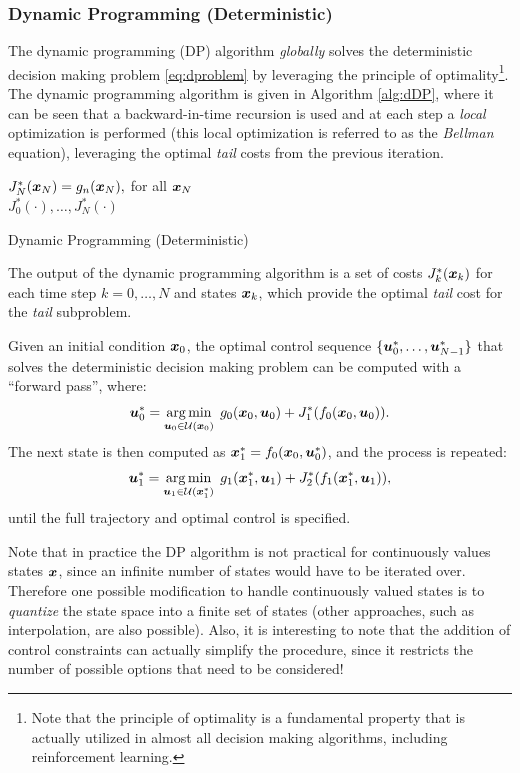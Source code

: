 \subsubsection{Dynamic Programming (Deterministic)}
The dynamic programming (DP) algorithm \textit{globally} solves the deterministic decision making problem \eqref{eq:dproblem} by leveraging the principle of optimality\footnote[][4\baselineskip]{Note that the principle of optimality is a fundamental property that is actually utilized in almost all decision making algorithms, including reinforcement learning.}. The dynamic programming algorithm is given in Algorithm \ref{alg:dDP}, where it can be seen that a backward-in-time recursion is used and at each step a \textit{local} optimization is performed (this local optimization is referred to as the \textit{Bellman} equation), leveraging the optimal \textit{tail} costs from the previous iteration.
\begin{algorithm}[ht]
 $J^*_N(\bm{x}_N) = g_n(\bm{x}_N),$ for all $\bm{x}_N$\\
 \Return $J^*_0(\cdot),\dots,J^*_N(\cdot)$
 \caption{Dynamic Programming (Deterministic)}
 \label{alg:dDP}
\end{algorithm}
The output of the dynamic programming algorithm is a set of costs $J^*_k(\bm{x}_k)$ for each time step $k = 0, \dots,N$ and states $\bm{x}_k$, which provide the optimal \textit{tail} cost for the \textit{tail} subproblem. 

Given an initial condition $\bm{x}_0$, the optimal control sequence $\{\bm{u}^*_0,\dots,\bm{u}^*_{N-1}\}$ that solves the deterministic decision making problem can be computed with a ``forward pass'', where:
\begin{equation*}
\bm{u}_0^* = \underset{\bm{u}_0 \in \mathcal{U}(\bm{x}_0)}{\arg \min}\:\:g_0(\bm{x}_0,\bm{u}_0) + J^*_{1}(f_0(\bm{x}_0, \bm{u}_0)).
\end{equation*}
The next state is then computed as $\bm{x}^*_1 = f_0(\bm{x}_0, \bm{u}^*_0)$, and the process is repeated:
\begin{equation*}
\bm{u}_1^* = \underset{\bm{u}_1 \in \mathcal{U}(\bm{x}^*_1)}{\arg \min}\:\:g_1(\bm{x}^*_1,\bm{u}_1) + J^*_{2}(f_1(\bm{x}^*_1, \bm{u}_1)),
\end{equation*}
until the full trajectory and optimal control is specified.

Note that in practice the DP algorithm is not practical for continuously values states $\bm{x}$, since an infinite number of states would have to be iterated over. Therefore one possible modification to handle continuously valued states is to \textit{quantize} the state space into a finite set of states (other approaches, such as interpolation, are also possible). Also, it is interesting to note that the addition of control constraints can actually simplify the procedure, since it restricts the number of possible options that need to be considered!

